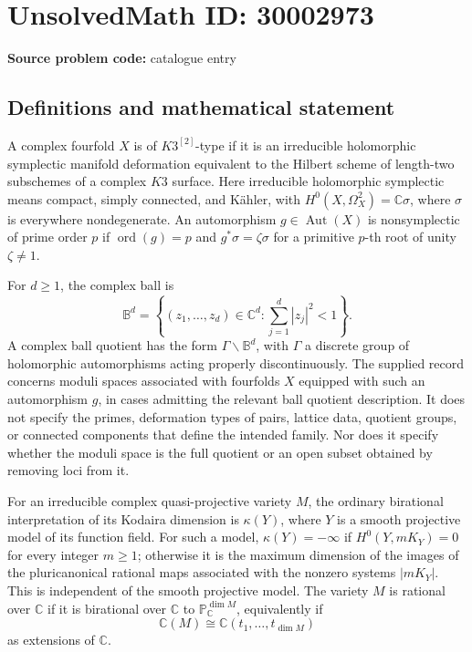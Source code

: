 \documentclass[11pt]{article}
\newcommand{\C}{\mathbb{C}}
\newcommand{\PP}{\mathbb{P}}
\begin{document}
\section*{UnsolvedMath ID: 30002973}
\textbf{Source problem code:} catalogue entry
\subsection{Definitions and mathematical statement}
A complex fourfold \(X\) is of \(K3^{[2]}\)-type if it is an irreducible holomorphic symplectic manifold deformation equivalent to the Hilbert scheme of length-two subschemes of a complex \(K3\) surface. Here irreducible holomorphic symplectic means compact, simply connected, and K\"ahler, with \(H^0(X,\Omega_X^2)=\C\sigma\), where \(\sigma\) is everywhere nondegenerate. An automorphism \(g\in\operatorname{Aut}(X)\) is nonsymplectic of prime order \(p\) if \(\operatorname{ord}(g)=p\) and \(g^*\sigma=\zeta\sigma\) for a primitive \(p\)-th root of unity \(\zeta\ne1\).

For \(d\geq1\), the complex ball is
\[
\mathbb B^d=\left\{(z_1,\ldots,z_d)\in\C^d:\sum_{j=1}^d|z_j|^2<1\right\}.
\]
A complex ball quotient has the form \(\Gamma\backslash\mathbb B^d\), with \(\Gamma\) a discrete group of holomorphic automorphisms acting properly discontinuously. The supplied record concerns moduli spaces associated with fourfolds \(X\) equipped with such an automorphism \(g\), in cases admitting the relevant ball quotient description. It does not specify the primes, deformation types of pairs, lattice data, quotient groups, or connected components that define the intended family. Nor does it specify whether the moduli space is the full quotient or an open subset obtained by removing loci from it.

For an irreducible complex quasi-projective variety \(M\), the ordinary birational interpretation of its Kodaira dimension is \(\kappa(Y)\), where \(Y\) is a smooth projective model of its function field. For such a model, \(\kappa(Y)=-\infty\) if \(H^0(Y,mK_Y)=0\) for every integer \(m\geq1\); otherwise it is the maximum dimension of the images of the pluricanonical rational maps associated with the nonzero systems \(|mK_Y|\). This is independent of the smooth projective model. The variety \(M\) is rational over \(\C\) if it is birational over \(\C\) to \(\PP^{\dim M}_{\C}\), equivalently if
\[
\C(M)\cong\C(t_1,\ldots,t_{\dim M})
\]
as extensions of \(\C\).
\end{document}
